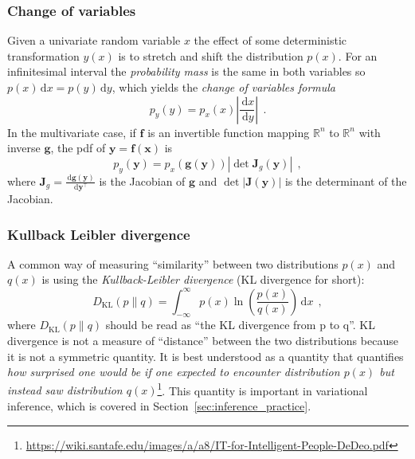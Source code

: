 \documentclass[12pt,dvipsnames]{report}
\newcommand{\ud}{\,\mathrm{d}}
\renewcommand{\vec}[1]{\boldsymbol{\mathbf{#1}}}
\newcommand{\hquad}{~~}
\begin{document}
\subsubsection{Change of variables}
Given a univariate random variable $x$ the effect of some deterministic
transformation $y(x)$ is to stretch and shift the distribution $p(x)$. For an
infinitesimal interval the \emph{probability mass} is the same in both
variables so $p(x) \ud x=p(y) \ud y$, which yields the \emph{change of variables
    formula}
\begin{equation}
    p_{y}(y)=p_{x}(x)\left|\frac{\ud x}{\ud y}\right|
    \hquad.
\end{equation}
In the multivariate case, if $\vec{f}$ is an invertible function mapping $\mathbb{R}^n$
to $\mathbb{R}^n$ with inverse $\vec{g}$, the pdf of $\vec{y}=\vec{f}(\vec{x})$ is
\citep{murphy_book_2022}
\begin{equation}
    p_{y}(\vec{y})=p_{x}(\vec{g}(\vec{y}))\left|\operatorname{det}\mathbf{J}_{g}(\vec{y})\right|
    \hquad,
\end{equation}
where $\vec{J}_{g}=\frac{\ud \vec{g}(\vec{y})}{\ud \vec{y}^{\intercal}}$ is the Jacobian of $\vec{g}$
and $\operatorname{det}|\mathbf{J}(\vec{y})|$ is the determinant of the Jacobian.

\subsubsection{Kullback Leibler divergence}
A common way of measuring ``similarity'' between two distributions $p(x)$ and
$q(x)$ is using the \emph{Kullback-Leibler divergence} (KL divergence for
short):
\begin{equation}
    D_{\mathrm{KL}}(p \| q)=\int_{-\infty}^{\infty} p(x) \ln \left(\frac{p(x)}{q(x)}\right) \ud x
    \hquad,
    \label{eq:kl_divergence}
\end{equation}
where $D_{\mathrm{KL}}(p \| q)$ should be read as ``the KL divergence from p to q''.
KL divergence is not a measure of ``distance'' between the two distributions because
it is not a symmetric quantity. It is best understood as a quantity that
quantifies \emph{how surprised one would be if one expected to encounter distribution $p(x)$
    but instead saw distribution
    $q(x)$}\footnote{\url{https://wiki.santafe.edu/images/a/a8/IT-for-Intelligent-People-DeDeo.pdf}}.
This quantity is important in variational inference, which is covered in
Section~\ref{sec:inference_practice}.
\end{document}

